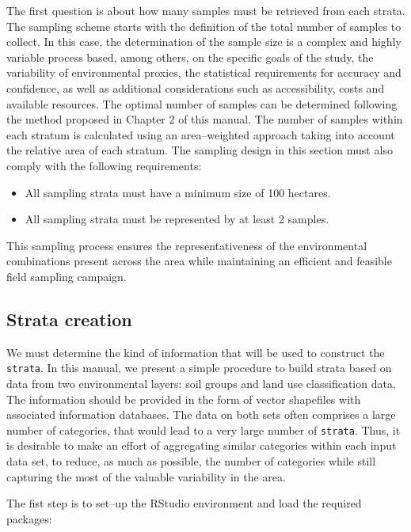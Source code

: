 \documentclass[
  10pt,
  b5paper,
  oneside]{book}
\providecommand{\tightlist}{%
  \setlength{\itemsep}{0pt}\setlength{\parskip}{0pt}}
\begin{document}
The first question is about how many samples must be retrieved from each strata. The sampling scheme starts with the definition of the total number of samples to collect. In this case, the determination of the sample size is a complex and highly variable process based, among others, on the specific goals of the study, the variability of environmental proxies, the statistical requirements for accuracy and confidence, as well as additional considerations such as accessibility, costs and available resources. The optimal number of samples can be determined following the method proposed in Chapter 2 of this manual. The number of samples within each stratum is calculated using an area--weighted approach taking into account the relative area of each stratum. The sampling design in this section must also comply with the following requirements:

\begin{itemize}
\tightlist
\item
  All sampling strata must have a minimum size of 100 hectares.
\item
  All sampling strata must be represented by at least 2 samples.
\end{itemize}

This sampling process ensures the representativeness of the environmental combinations present across the area while maintaining an efficient and feasible field sampling campaign.

\hypertarget{strata-creation}{%
\subsection{Strata creation}\label{strata-creation}}

We must determine the kind of information that will be used to construct the \texttt{strata}. In this manual, we present a simple procedure to build strata based on data from two environmental layers: soil groups and land use classification data. The information should be provided in the form of vector shapefiles with associated information databases. The data on both sets often comprises a large number of categories, that would lead to a very large number of \texttt{strata}. Thus, it is desirable to make an effort of aggregating similar categories within each input data set, to reduce, as much as possible, the number of categories while still capturing the most of the valuable variability in the area.

The fist step is to set--up the RStudio environment and load the required packages:
\end{document}
